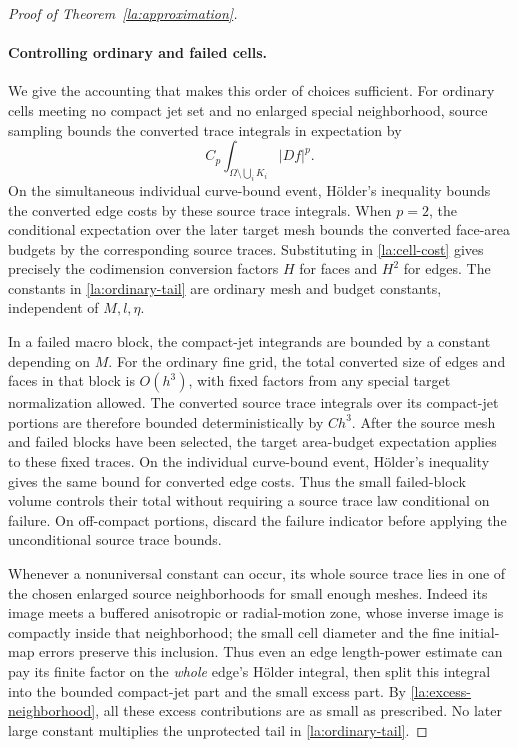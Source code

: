 \documentclass[11pt]{article}
\numberwithin{equation}{section}
\theoremstyle{definition}
\theoremstyle{remark}
\begin{document}
\begin{proof}[Proof of Theorem~\ref{la:approximation}]
\paragraph{Controlling ordinary and failed cells.}
We give the accounting that makes this order of choices sufficient.
For ordinary cells meeting no compact jet set and no enlarged special
neighborhood, source sampling bounds the converted trace integrals in
expectation by
\begin{equation}\label{la:ordinary-tail}
 C_p\int_{\Omega\setminus\bigcup_iK_i}|Df|^p.
\end{equation}
On the simultaneous individual curve-bound event, H\"older's inequality
bounds the converted edge costs by these source trace integrals.  When
$p=2$, the conditional expectation over the later target mesh bounds
the converted face-area budgets by the corresponding source traces.
Substituting in \eqref{la:cell-cost} gives precisely the codimension
conversion factors $H$ for faces and $H^2$ for edges.  The constants in
\eqref{la:ordinary-tail} are ordinary mesh and budget constants,
independent of $M,l,\eta$.

In a failed macro block, the compact-jet integrands are bounded by a
constant depending on $M$.  For the ordinary fine grid, the total
converted size of edges and faces in that block is $O(h^3)$, with
fixed factors from any special target normalization allowed.
The converted source trace integrals over its compact-jet portions
are therefore bounded deterministically by $C h^3$.  After the source
mesh and failed blocks have been selected, the target area-budget
expectation applies to these fixed traces.  On the individual
curve-bound event, H\"older's inequality gives the same bound for
converted edge costs.  Thus the small failed-block volume controls
their total without requiring a source trace law conditional on
failure.  On off-compact portions, discard the failure indicator
before applying the unconditional source trace bounds.

Whenever a nonuniversal constant can occur, its whole source trace
lies in one of the chosen enlarged source neighborhoods for small
enough meshes.  Indeed its image meets a buffered anisotropic or
radial-motion zone, whose inverse image is compactly inside that
neighborhood; the small cell diameter and the fine initial-map
errors preserve this inclusion.  Thus even an edge length-power
estimate can pay its finite factor on the \emph{whole} edge's
H\"older integral, then split this integral into the bounded
compact-jet part and the small excess part.  By
\eqref{la:excess-neighborhood}, all these excess contributions are
as small as prescribed.  No later large constant multiplies the
unprotected tail in \eqref{la:ordinary-tail}.


\end{proof}
\end{document}
